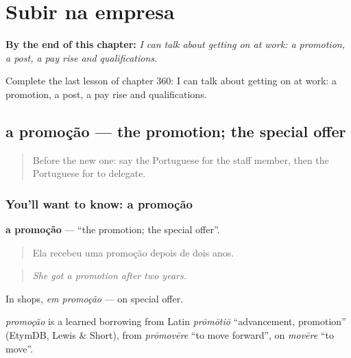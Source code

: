 
\chapter{Subir na empresa}
\label{ch:pt-subir-na-empresa}

\begin{chapteropening}
\textbf{By the end of this chapter:} \emph{I can talk about getting on at work: a promotion, a post, a pay rise and qualifications.}

Complete the last lesson of chapter 360: I can talk about getting on at work: a promotion, a post, a pay rise and qualifications.
\end{chapteropening}

\section[a promoção]{a promoção — the promotion; the special offer}

\label{lesson:PT-C360-promocao}



\begin{quote}
Before the new one: say the Portuguese for the staff member, then the Portuguese for to delegate.
\end{quote}

\subsection*{You'll want to know: a promoção}
\textbf{a promoção} — \textquotedblleft{}the promotion; the special offer\textquotedblright{}.

\begin{quote}
Ela recebeu uma promoção depois de dois anos.
\end{quote}

\begin{quote}
\emph{She got a promotion after two years.}
\end{quote}

In shops, \emph{em promoção} — on special offer.

\begin{cousinweb}
\emph{promoção} is a learned borrowing from Latin \emph{prōmōtiō} \textquotedblleft{}advancement, promotion\textquotedblright{} (EtymDB, Lewis \& Short), from \emph{prōmovēre} \textquotedblleft{}to move forward\textquotedblright{}, on \emph{movēre} \textquotedblleft{}to move\textquotedblright{}.
\end{cousinweb}

